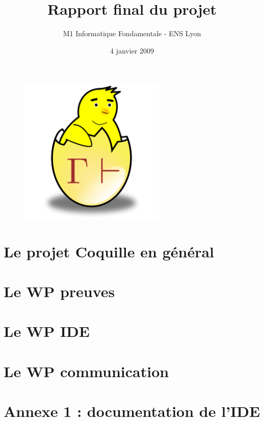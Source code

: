 \documentclass[a4paper,10pt]{report}
\date{4 janvier 2009}
\title{Rapport final du projet \coquille{}}
\author{M1 Informatique Fondamentale - ENS Lyon}
\begin{document}
\begin{figure}
\begin{center}
 \includegraphics[width=7cm]{../images/common/poussin.png}
\end{center}
\end{figure}

\maketitle

\newpage

\tableofcontents

\chapter{Le projet Coquille en g\'en\'eral}


\chapter{Le WP preuves}


\chapter{Le WP IDE}


%

\chapter{Le WP communication}





\chapter{Annexe 1 : documentation de l'IDE}
%
\end{document}
